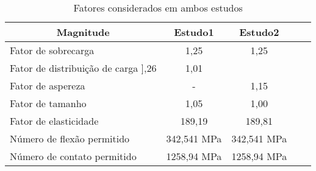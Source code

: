 \begin{table}[]
\centering
\caption{\label{tab:9} Fatores considerados em ambos estudos}
\begin{tabular}{l c c c c}
\hline
\multicolumn{1}{c}{\textbf{Magnitude}} & \textbf{Estudo1} & \textbf{Estudo2} \\ \hline
Fator de sobrecarga                 & 1,25              & 1,25 \\
Fator de distribuição de carga      
],26              & 1,01              \\
Fator de aspereza                      & -                 & 1,15              \\
Fator de tamanho                       & 1,05              & 1,00              \\
Fator de elasticidade                  & 189,19            & 189,81            \\
Número de flexão permitido             & 342,541 MPa       & 342,541 MPa       \\
Número de contato permitido            & 1258,94 MPa       & 1258,94 MPa   \\ \hline  
\end{tabular}
\end{table}